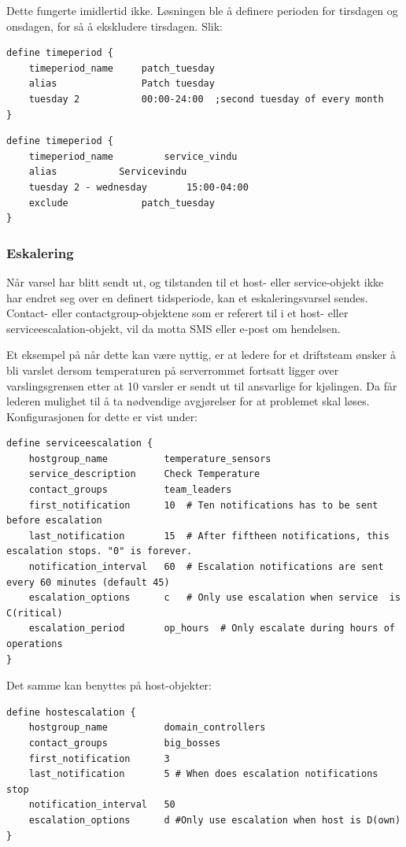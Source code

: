 Dette fungerte imidlertid ikke. Løsningen ble å definere perioden for tirsdagen og onsdagen, for så å ekskludere tirsdagen. Slik:
\begin{lstlisting}[style=example]
define timeperiod {
    timeperiod_name 	patch_tuesday
    alias           	Patch tuesday
    tuesday 2          	00:00-24:00  ;second tuesday of every month
}
\end{lstlisting}

\begin{lstlisting}[style=example]
define timeperiod {
    timeperiod_name     	service_vindu
    alias			Servicevindu
    tuesday 2 - wednesday   	15:00-04:00
    exclude 			patch_tuesday
}
\end{lstlisting}

\subsubsection{Eskalering}
Når varsel har blitt sendt ut, og tilstanden til et host- eller service-objekt ikke har endret seg over en definert tidsperiode, kan et eskaleringsvarsel sendes. Contact- eller contactgroup-objektene som er referert til i et host- eller serviceescalation-objekt, vil da motta SMS eller e-post om hendelsen.

Et eksempel på når dette kan være nyttig, er at ledere for et driftsteam ønsker å bli varslet dersom temperaturen på serverrommet fortsatt ligger over varslingsgrensen etter at 10 varsler er sendt ut til ansvarlige for kjølingen. Da får lederen mulighet til å ta nødvendige avgjørelser for at problemet skal løses. Konfigurasjonen for dette er vist under:
\begin{lstlisting}[style=example]
define serviceescalation {
	hostgroup_name			temperature_sensors
	service_description		Check Temperature
	contact_groups			team_leaders
	first_notification		10	# Ten notifications has to be sent before escalation
	last_notification		15	# After fiftheen notifications, this escalation stops. "0" is forever.
	notification_interval	60 	# Escalation notifications are sent every 60 minutes (default 45)
	escalation_options		c	# Only use escalation when service  is C(ritical)
	escalation_period		op_hours  # Only escalate during hours of operations
}
\end{lstlisting}
Det samme kan benyttes på host-objekter:
\begin{lstlisting}[style=example]
define hostescalation {
	hostgroup_name			domain_controllers
	contact_groups			big_bosses
	first_notification		3 	
	last_notification		5 # When does escalation notifications stop
	notification_interval	50
	escalation_options		d #Only use escalation when host is D(own)
}
\end{lstlisting}

